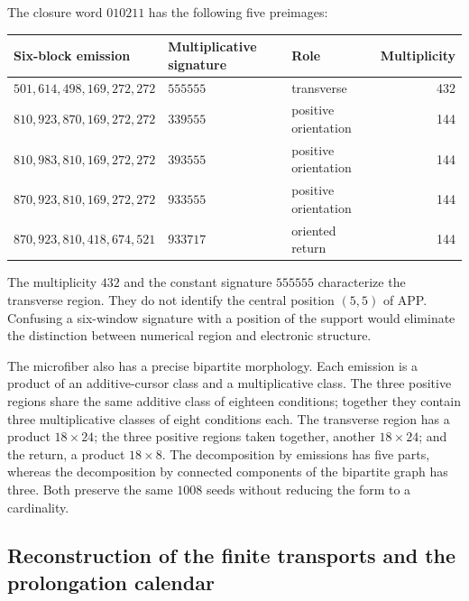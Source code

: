 The closure word \(010211\) has the following five preimages:
\begin{center}\small
\begin{tabular}{@{}lll r@{}}\toprule
Six-block emission&Multiplicative signature&Role&Multiplicity\\\midrule
\(501,614,498,169,272,272\)&\(555555\)&transverse&432\\
\(810,923,870,169,272,272\)&\(339555\)&positive orientation&144\\
\(810,983,810,169,272,272\)&\(393555\)&positive orientation&144\\
\(870,923,810,169,272,272\)&\(933555\)&positive orientation&144\\
\(870,923,810,418,674,521\)&\(933717\)&oriented return&144\\\bottomrule
\end{tabular}
\end{center}
The multiplicity \(432\) and the constant signature \(555555\) characterize the transverse region. They do not identify the central position \((5,5)\) of APP. Confusing a six-window signature with a position of the support would eliminate the distinction between numerical region and electronic structure.

The microfiber also has a precise bipartite morphology. Each emission is a product of an additive-cursor class and a multiplicative class. The three positive regions share the same additive class of eighteen conditions; together they contain three multiplicative classes of eight conditions each. The transverse region has a product \(18\times24\); the three positive regions taken together, another \(18\times24\); and the return, a product \(18\times8\). The decomposition by emissions has five parts, whereas the decomposition by connected components of the bipartite graph has three. Both preserve the same \(1008\) seeds without reducing the form to a cardinality.





\subsection{Reconstruction of the finite transports and the prolongation calendar}

